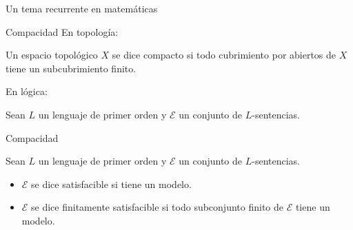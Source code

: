 \begin{frame}{Un tema recurrente en matemáticas}
    \vfill
    \vfill
\end{frame}
\begin{frame}{Compacidad}
   En topología:
   \begin{Def}
      Un espacio topológico $X$ se dice compacto si todo cubrimiento por abiertos de $X$ tiene un subcubrimiento finito.\vspace{0.3cm}
   \end{Def}
   \vspace{0.3cm}
   En lógica:
   \begin{Tma}[De compacidad]
      Sean $L$ un lenguaje de primer orden y $\mathcal{E}$ un conjunto de $L$-sentencias.
   \end{Tma}
\end{frame}
\begin{frame}{Compacidad}
    \begin{Tma}[De compacidad]
      Sean $L$ un lenguaje de primer orden y $\mathcal{E}$ un conjunto de $L$-sentencias.
   \end{Tma}
   \vspace{0.3cm}
   \begin{itemize}
      \item $\mathcal{E}$ se dice satisfacible si tiene un modelo.
      \item<2-> $\mathcal{E}$ se dice finitamente satisfacible si todo subconjunto finito de $\mathcal{E}$ tiene un modelo.
   \end{itemize}
\end{frame}


